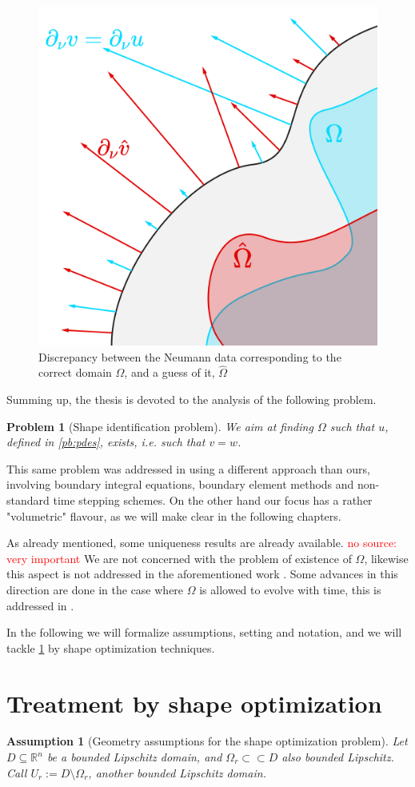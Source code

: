 \documentclass[english,a4paper,9pt,oneside]{scrbook}	%
\theoremstyle{break}
\newtheorem{ass}[equation]{Assumption}
\newtheorem{pb}[equation]{Problem}
\theoremstyle{remark}
\newcommand{\mR}{\mathbb{R}}
\newcommand{\cc}{\subset\subset}
\begin{document}
\begin{figure}[H]
\centering
\includegraphics[width=0.25\columnwidth]{Images/NormalDiscrepancy.pdf}
\caption{Discrepancy between the Neumann data corresponding to the correct domain $\Omega$, and a guess of it, $\hat{\Omega}$}\label{fig:normal_discrepancy}
\end{figure}

Summing up, the thesis is devoted to the analysis of the following problem.

\begin{pb}[Shape identification problem]
\label{pb:shid}
We aim at finding $\Omega$ such that $u$, defined in \cref{pb:pdes}, exists, i.e. such that $v=w$.
\end{pb}

This same problem was addressed in \cite{harbrecht} using a different approach than ours, involving boundary integral equations, boundary element methods and non-standard time stepping schemes. On the other hand our focus has a rather "volumetric" flavour, as we will make clear in the following chapters. 

As already mentioned, some uniqueness results are already available. \textcolor{red}{no source: very important} We are not concerned with the problem of existence of $\Omega$, likewise this aspect is not addressed in the aforementioned work \cite{harbrecht}. Some advances in this direction are done in the case where $\Omega$ is allowed to evolve with time, this is addressed in \cite{brugger}.

In the following we will formalize assumptions, setting and notation, and we will tackle \cref{pb:shid} by shape optimization techniques.

\section{Treatment by shape optimization}
\label{sec:shopt_treatment}

\begin{ass}[Geometry assumptions for the shape optimization problem]
\label{ass:geo_sh}
Let $D\subseteq \mR^n$ be a bounded Lipschitz domain, and $\Omega_r \cc D$ also bounded Lipschitz. Call $U_r:=D\setminus \Omega_r$, another bounded Lipschitz domain.
\end{ass}
\end{document}
